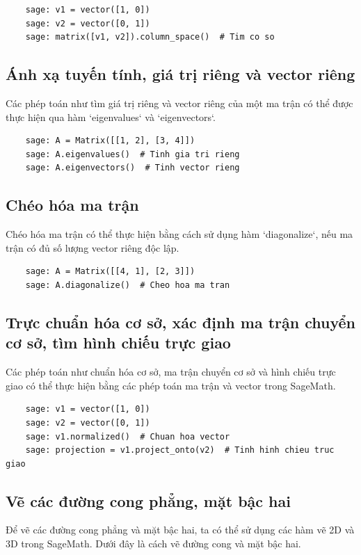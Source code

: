 \begin{lstlisting}
	sage: v1 = vector([1, 0])
	sage: v2 = vector([0, 1])
	sage: matrix([v1, v2]).column_space()  # Tim co so
\end{lstlisting}

\subsection{Ánh xạ tuyến tính, giá trị riêng và vector riêng}
Các phép toán như tìm giá trị riêng và vector riêng của một ma trận có thể được thực hiện qua hàm `eigenvalues` và `eigenvectors`.

\begin{lstlisting}
	sage: A = Matrix([[1, 2], [3, 4]])
	sage: A.eigenvalues()  # Tinh gia tri rieng
	sage: A.eigenvectors()  # Tinh vector rieng
\end{lstlisting}

\subsection{Chéo hóa ma trận}
Chéo hóa ma trận có thể thực hiện bằng cách sử dụng hàm `diagonalize`, nếu ma trận có đủ số lượng vector riêng độc lập.

\begin{lstlisting}
	sage: A = Matrix([[4, 1], [2, 3]])
	sage: A.diagonalize()  # Cheo hoa ma tran
\end{lstlisting}

\subsection{Trực chuẩn hóa cơ sở, xác định ma trận chuyển cơ sở, tìm hình chiếu trực giao}
Các phép toán như chuẩn hóa cơ sở, ma trận chuyển cơ sở và hình chiếu trực giao có thể thực hiện bằng các phép toán ma trận và vector trong SageMath.

\begin{lstlisting}
	sage: v1 = vector([1, 0])
	sage: v2 = vector([0, 1])
	sage: v1.normalized()  # Chuan hoa vector
	sage: projection = v1.project_onto(v2)  # Tinh hinh chieu truc giao
\end{lstlisting}

\subsection{Vẽ các đường cong phẳng, mặt bậc hai}
Để vẽ các đường cong phẳng và mặt bậc hai, ta có thể sử dụng các hàm vẽ 2D và 3D trong SageMath. Dưới đây là cách vẽ đường cong và mặt bậc hai.

